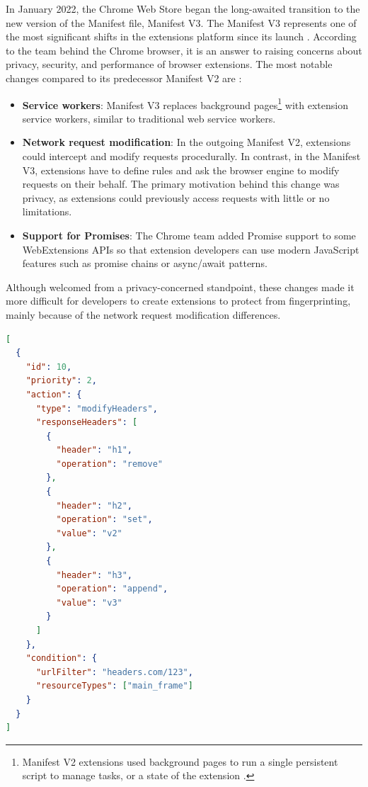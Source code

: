 In January 2022, the Chrome Web Store began the long-awaited transition to the new version of the Manifest file, Manifest V3. The Manifest V3 represents one of the most significant shifts in the extensions platform since its launch \cite{ChromeWebExtensions}. According to the team behind the Chrome browser, it is an answer to raising concerns about privacy, security, and performance of browser extensions. The most notable changes compared to its predecessor Manifest V2 are \cite{ChromeWebExtensions}:

\begin{itemize}
	\item \textbf{Service workers}: Manifest V3 replaces background pages\footnote{Manifest V2 extensions used background pages to run a single persistent script to manage tasks, or a state of the extension \cite{ChromeManifestV2}.} with extension service workers, similar to traditional web service workers.
	\item \textbf{Network request modification}: In the outgoing Manifest V2, extensions could intercept and modify requests procedurally. In contrast, in the Manifest V3, extensions have to define rules and ask the browser engine to modify requests on their behalf. The primary motivation behind this change was privacy, as extensions could previously access requests with little or no limitations.
	\item \textbf{Support for Promises}: The Chrome team added Promise support to some WebExtensions APIs so that extension developers can use modern JavaScript features such as promise chains or async/await patterns.
\end{itemize}

Although welcomed from a privacy-concerned standpoint, these changes made it more difficult for developers to create extensions to protect from fingerprinting, mainly because of the network request modification differences.

\bigbreak

\begin{lstlisting}[language={JSON},caption={An example of a declarative rule which modifies selected response headers \cite{ChromeWebExtensions}.}, label={Listing:ManifestV3RuleExample}]
[
  {
    "id": 10,
    "priority": 2,
    "action": {
      "type": "modifyHeaders",
      "responseHeaders": [
        {
          "header": "h1",
          "operation": "remove"
        },
        {
          "header": "h2",
          "operation": "set",
          "value": "v2"
        },
        {
          "header": "h3",
          "operation": "append",
          "value": "v3"
        }
      ]
    },
    "condition": {
      "urlFilter": "headers.com/123",
      "resourceTypes": ["main_frame"]
    }
  }
]
\end{lstlisting}

